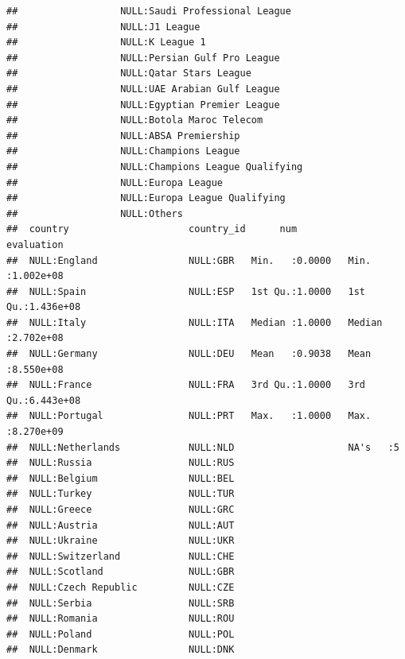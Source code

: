 \documentclass{article}\usepackage[]{graphicx}\usepackage[]{color}
\makeatletter
\newenvironment{kframe}{%
 \def\at@end@of@kframe{}%
 \ifinner\ifhmode%
  \def\at@end@of@kframe{\end{minipage}}%
  \begin{minipage}{\columnwidth}%
 \fi\fi%
 \def\FrameCommand##1{\hskip\@totalleftmargin \hskip-\fboxsep
 \colorbox{shadecolor}{##1}\hskip-\fboxsep
     \hskip-\linewidth \hskip-\@totalleftmargin \hskip\columnwidth}%
 \MakeFramed {\advance\hsize-\width
   \@totalleftmargin\z@ \linewidth\hsize
   \@setminipage}}%
 {\par\unskip\endMakeFramed%
 \at@end@of@kframe}
\newenvironment{knitrout}{}{} %
\makeatother
\begin{document}
\begin{knitrout}
\begin{kframe}
\begin{verbatim}
##                  NULL:Saudi Professional League                
##                  NULL:J1 League                                
##                  NULL:K League 1                               
##                  NULL:Persian Gulf Pro League                  
##                  NULL:Qatar Stars League                       
##                  NULL:UAE Arabian Gulf League                  
##                  NULL:Egyptian Premier League                  
##                  NULL:Botola Maroc Telecom                     
##                  NULL:ABSA Premiership                         
##                  NULL:Champions League                         
##                  NULL:Champions League Qualifying              
##                  NULL:Europa League                            
##                  NULL:Europa League Qualifying                 
##                  NULL:Others                                   
##  country                     country_id      num           evaluation       
##  NULL:England                NULL:GBR   Min.   :0.0000   Min.   :1.002e+08  
##  NULL:Spain                  NULL:ESP   1st Qu.:1.0000   1st Qu.:1.436e+08  
##  NULL:Italy                  NULL:ITA   Median :1.0000   Median :2.702e+08  
##  NULL:Germany                NULL:DEU   Mean   :0.9038   Mean   :8.550e+08  
##  NULL:France                 NULL:FRA   3rd Qu.:1.0000   3rd Qu.:6.443e+08  
##  NULL:Portugal               NULL:PRT   Max.   :1.0000   Max.   :8.270e+09  
##  NULL:Netherlands            NULL:NLD                    NA's   :5          
##  NULL:Russia                 NULL:RUS                                       
##  NULL:Belgium                NULL:BEL                                       
##  NULL:Turkey                 NULL:TUR                                       
##  NULL:Greece                 NULL:GRC                                       
##  NULL:Austria                NULL:AUT                                       
##  NULL:Ukraine                NULL:UKR                                       
##  NULL:Switzerland            NULL:CHE                                       
##  NULL:Scotland               NULL:GBR                                       
##  NULL:Czech Republic         NULL:CZE                                       
##  NULL:Serbia                 NULL:SRB                                       
##  NULL:Romania                NULL:ROU                                       
##  NULL:Poland                 NULL:POL                                       
##  NULL:Denmark                NULL:DNK                                       

\end{verbatim}
\end{kframe}
\end{knitrout}
\end{document}
